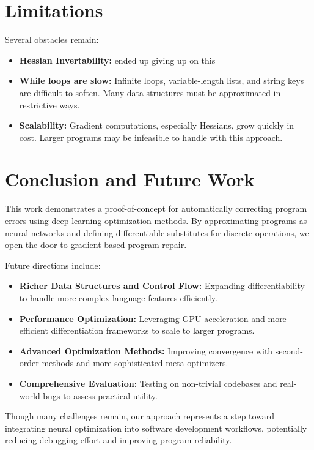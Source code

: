 \documentclass{article}
\begin{document}
\section{Limitations}
Several obstacles remain:
\begin{itemize}
    \item \textbf{Hessian Invertability:} ended up giving up on this
    \item \textbf{While loops are slow:} Infinite loops, variable-length lists, and string keys are difficult to soften. Many data structures must be approximated in restrictive ways.
    \item \textbf{Scalability:} Gradient computations, especially Hessians, grow quickly in cost. Larger programs may be infeasible to handle with this approach.
\end{itemize}

\section{Conclusion and Future Work}
This work demonstrates a proof-of-concept for automatically correcting program errors using deep learning optimization methods. By approximating programs as neural networks and defining differentiable substitutes for discrete operations, we open the door to gradient-based program repair.

Future directions include:
\begin{itemize}
    \item \textbf{Richer Data Structures and Control Flow:} Expanding differentiability to handle more complex language features efficiently.
    \item \textbf{Performance Optimization:} Leveraging GPU acceleration and more efficient differentiation frameworks to scale to larger programs.
    \item \textbf{Advanced Optimization Methods:} Improving convergence with second-order methods and more sophisticated meta-optimizers.
    \item \textbf{Comprehensive Evaluation:} Testing on non-trivial codebases and real-world bugs to assess practical utility.
\end{itemize}

Though many challenges remain, our approach represents a step toward integrating neural optimization into software development workflows, potentially reducing debugging effort and improving program reliability.



\end{document}
